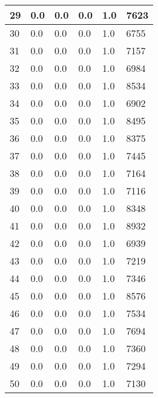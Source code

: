 \begin{longtable}{|l|l|l|l|l|l|}
29 & 0.0 & 0.0 & 0.0 & 1.0 & 7623 \\ \hline 
30 & 0.0 & 0.0 & 0.0 & 1.0 & 6755 \\ \hline 
31 & 0.0 & 0.0 & 0.0 & 1.0 & 7157 \\ \hline 
32 & 0.0 & 0.0 & 0.0 & 1.0 & 6984 \\ \hline 
33 & 0.0 & 0.0 & 0.0 & 1.0 & 8534 \\ \hline 
34 & 0.0 & 0.0 & 0.0 & 1.0 & 6902 \\ \hline 
35 & 0.0 & 0.0 & 0.0 & 1.0 & 8495 \\ \hline 
36 & 0.0 & 0.0 & 0.0 & 1.0 & 8375 \\ \hline 
37 & 0.0 & 0.0 & 0.0 & 1.0 & 7445 \\ \hline 
38 & 0.0 & 0.0 & 0.0 & 1.0 & 7164 \\ \hline 
39 & 0.0 & 0.0 & 0.0 & 1.0 & 7116 \\ \hline 
40 & 0.0 & 0.0 & 0.0 & 1.0 & 8348 \\ \hline 
41 & 0.0 & 0.0 & 0.0 & 1.0 & 8932 \\ \hline 
42 & 0.0 & 0.0 & 0.0 & 1.0 & 6939 \\ \hline 
43 & 0.0 & 0.0 & 0.0 & 1.0 & 7219 \\ \hline 
44 & 0.0 & 0.0 & 0.0 & 1.0 & 7346 \\ \hline 
45 & 0.0 & 0.0 & 0.0 & 1.0 & 8576 \\ \hline 
46 & 0.0 & 0.0 & 0.0 & 1.0 & 7534 \\ \hline 
47 & 0.0 & 0.0 & 0.0 & 1.0 & 7694 \\ \hline 
48 & 0.0 & 0.0 & 0.0 & 1.0 & 7360 \\ \hline 
49 & 0.0 & 0.0 & 0.0 & 1.0 & 7294 \\ \hline 
50 & 0.0 & 0.0 & 0.0 & 1.0 & 7130 \\ \hline 
\end{longtable}